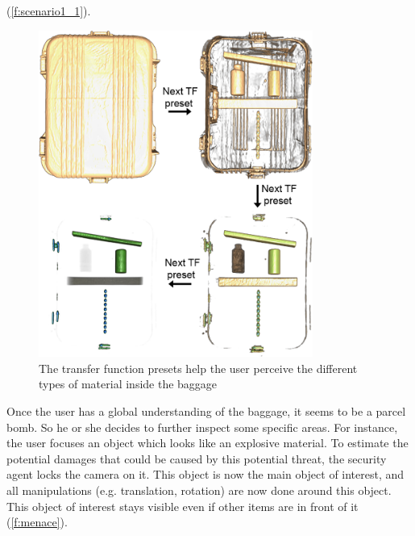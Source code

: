 (\autoref{f:scenario1_1}).
\begin{figure}
\centering
\includegraphics[width=9cm]{Figures/scenario1_1.png}
\caption{ The transfer function presets help the user perceive the different types of material inside the baggage }
\label{f:scenario1_1}
\end{figure}    
Once the user has a global understanding of the baggage, it seems to be a parcel bomb. So he or she decides to further inspect some specific areas. For instance, the user focuses an object which looks like an explosive material. To estimate the potential damages that could be caused by this potential threat, the security agent locks the camera on it. This object is now the main object of interest, and all manipulations (e.g. translation, rotation) are now done around this object. This object of interest stays visible even if other items are in front of it (\autoref{f:menace}). 

